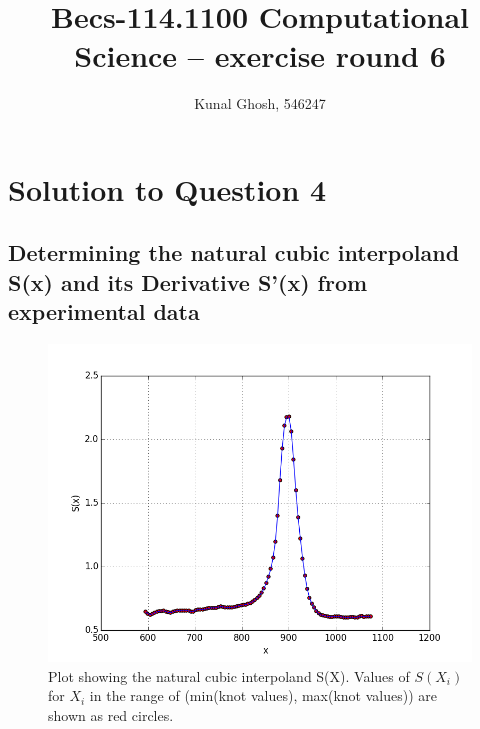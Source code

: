 \documentclass[a4paper,11pt]{article}
\begin{document}
\title{Becs-114.1100 Computational Science -- exercise round 6} %
\author{Kunal Ghosh, 546247} %
\maketitle
\section{Solution to Question 4}
\subsection{Determining the natural cubic interpoland S(x) and its Derivative S'(x) from experimental data}\label{prob2a}
\begin{figure}[ht]
	\center
    \includegraphics[scale=0.75]{plotS.png}
    \caption{Plot showing the natural cubic interpoland S(X). Values of $S(X_i)$ for $X_i$ in the range of (min(knot values), max(knot values)) are shown as red circles.}
	\label{fig:s}
\end{figure}
\end{document}
